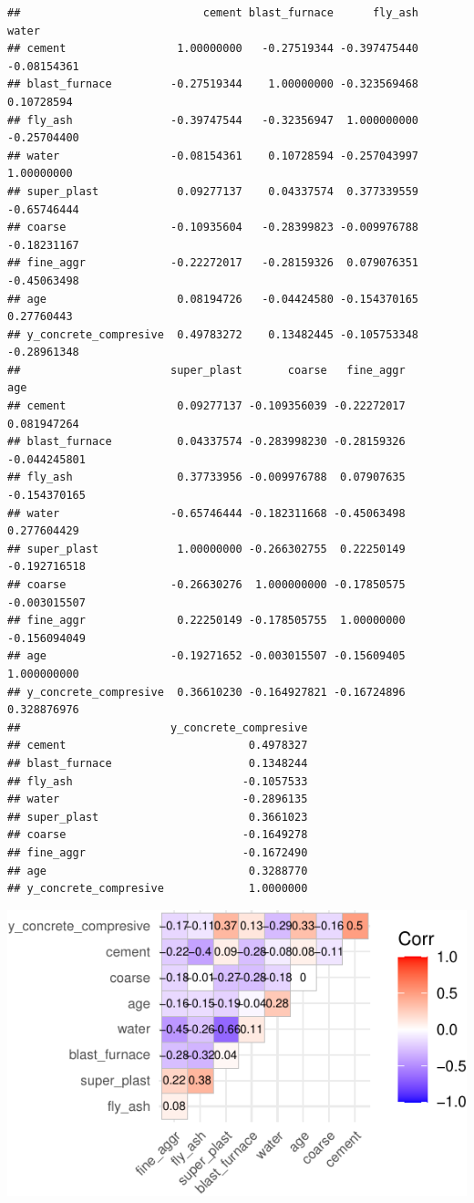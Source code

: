 \documentclass[
  12pt,
]{article}
\begin{document}
\begin{verbatim}
##                            cement blast_furnace      fly_ash       water
## cement                 1.00000000   -0.27519344 -0.397475440 -0.08154361
## blast_furnace         -0.27519344    1.00000000 -0.323569468  0.10728594
## fly_ash               -0.39747544   -0.32356947  1.000000000 -0.25704400
## water                 -0.08154361    0.10728594 -0.257043997  1.00000000
## super_plast            0.09277137    0.04337574  0.377339559 -0.65746444
## coarse                -0.10935604   -0.28399823 -0.009976788 -0.18231167
## fine_aggr             -0.22272017   -0.28159326  0.079076351 -0.45063498
## age                    0.08194726   -0.04424580 -0.154370165  0.27760443
## y_concrete_compresive  0.49783272    0.13482445 -0.105753348 -0.28961348
##                       super_plast       coarse   fine_aggr          age
## cement                 0.09277137 -0.109356039 -0.22272017  0.081947264
## blast_furnace          0.04337574 -0.283998230 -0.28159326 -0.044245801
## fly_ash                0.37733956 -0.009976788  0.07907635 -0.154370165
## water                 -0.65746444 -0.182311668 -0.45063498  0.277604429
## super_plast            1.00000000 -0.266302755  0.22250149 -0.192716518
## coarse                -0.26630276  1.000000000 -0.17850575 -0.003015507
## fine_aggr              0.22250149 -0.178505755  1.00000000 -0.156094049
## age                   -0.19271652 -0.003015507 -0.15609405  1.000000000
## y_concrete_compresive  0.36610230 -0.164927821 -0.16724896  0.328876976
##                       y_concrete_compresive
## cement                            0.4978327
## blast_furnace                     0.1348244
## fly_ash                          -0.1057533
## water                            -0.2896135
## super_plast                       0.3661023
## coarse                           -0.1649278
## fine_aggr                        -0.1672490
## age                               0.3288770
## y_concrete_compresive             1.0000000
\end{verbatim}

\begin{center}\includegraphics{rmd_final_files/figure-latex/corr_y-1} \end{center}
\end{document}
